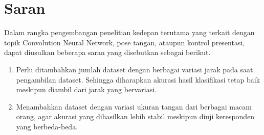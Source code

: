 \section{Saran}
\label{chap:saran}

Dalam rangka pengembangan penelitian kedepan terutama yang terkait dengan topik Convolution Neural Network, pose tangan, ataupun kontrol presentasi, dapat diusulkan beberapa saran yang disebutkan sebagai berikut.

\begin{enumerate}[nolistsep]
  \item Perlu ditambahkan jumlah dataset dengan berbagai variasi jarak pada saat pengambilan dataset. Sehingga diharapkan akurasi hasil klasifikasi tetap baik meskipun diambil dari jarak yang bervariasi.
  \item Menambahkan dataset dengan variasi ukuran tangan dari berbagai macam orang, agar akurasi yang dihasilkan lebih stabil meskipun diuji keresponden yang berbeda-beda.
\end{enumerate} 
